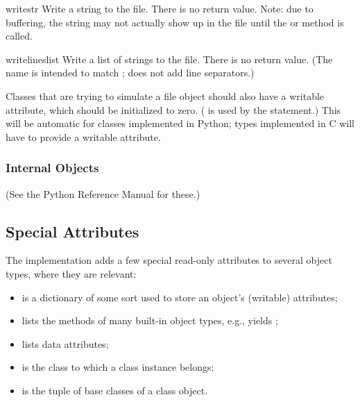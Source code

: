 \begin{funcdesc}{write}{str}
Write a string to the file.  There is no return value.  Note: due to
buffering, the string may not actually show up in the file until
the  or  method is called.
\end{funcdesc}

\begin{funcdesc}{writelines}{list}
Write a list of strings to the file.  There is no return value.
(The name is intended to match ; 
does not add line separators.)
\end{funcdesc}

Classes that are trying to simulate a file object should also have a
writable  attribute, which should be initialized to
zero.  ( is used by the  statement.)  This
will be automatic for classes implemented in Python; types implemented
in C will have to provide a writable  attribute.

\subsubsection{Internal Objects}

(See the Python Reference Manual for these.)

\subsection{Special Attributes}

The implementation adds a few special read-only attributes to several
object types, where they are relevant:

\begin{itemize}

\item
{} is a dictionary of some sort used to store an
object's (writable) attributes;

\item
{} lists the methods of many built-in object types,
e.g.,  yields
;

\item
{} lists data attributes;

\item
{} is the class to which a class instance belongs;

\item
{} is the tuple of base classes of a class object.

\end{itemize}
